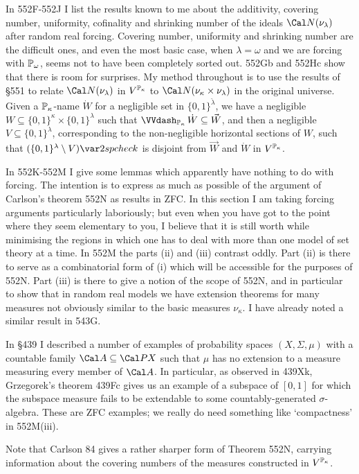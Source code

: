 {In 552F-552J %
I list the results known to me about the
additivity, covering number, uniformity, cofinality and shrinking number
of the ideals
$\Cal N(\nu_{\lambda})$ after random real forcing.   Covering number,
uniformity and shrinking number are the
difficult ones, and even the most basic case, when $\lambda=\omega$ and
we are forcing with $\Bbb P_{\omega}$, seems not to have been completely
sorted out.   552Gb and 552Hc show that there is room for surprises.
My method throughout is to use the results of \S551 to relate
$\Cal N(\nu_{\lambda})$ in $V^{\Bbb P_{\kappa}}$ to
$\Cal N(\nu_{\kappa}\times\nu_{\lambda})$ in the original universe.  Given a
$\Bbb P_{\kappa}$-name $\dot W$ for a negligible set in
$\{0,1\}^{\check\lambda}$, we
have a negligible $W\subseteq\{0,1\}^{\kappa}\times\{0,1\}^{\lambda}$ such that
$\VVdPk\,\dot W\subseteq\vec W$, and then a negligible
$V\subseteq\{0,1\}^{\lambda}$, corresponding to the non-negligible horizontal
sections of $W$, such that $(\{0,1\}^{\lambda}\setminus V)\var2spcheck$ is
disjoint from $\vec W$ and $\dot W$ in $V^{\Bbb P_{\kappa}}$.

In 552K-552M %
I give some lemmas which apparently have nothing to do with forcing.   The
intention is to express as much as possible of the argument of Carlson's
theorem 552N as results in ZFC.   In this section I am taking forcing
arguments particularly laboriously;  but even when you have got to the
point where they seem elementary to you, I believe that it is still worth
while minimising the regions in which one has to deal with more than one
model of set theory at a time.
In 552M the parts (ii) and (iii) contrast oddly.   Part
(ii) is there to serve
as a combinatorial form of (i) which will be
accessible for the purposes of 552N.    Part (iii) is there to give
a notion of the scope of 552N, and in particular to show that in
random real models we have extension theorems for many measures not
obviously similar to the basic measures $\nu_{\kappa}$.   I have already
noted a similar result in 543G.

In \S439 I described a number of examples of probability spaces
$(X,\Sigma,\mu)$ with a countable family $\Cal A\subseteq\Cal PX$ such that
$\mu$ has no extension to a measure measuring every member of $\Cal A$.
In particular, as observed in 439Xk, Grzegorek's theorem 439Fc
gives us an example of a subspace of $[0,1]$ for which the subspace measure
fails to be extendable to some countably-generated $\sigma$-algebra.
These are ZFC examples;  we really do need something like `compactness'
in 552M(iii).

Note that {\smc Carlson 84} gives a rather sharper form of Theorem 552N,
carrying information about the covering numbers
of the measures constructed in $V^{\Bbb P_{\kappa}}$.

}%

\discrpage

